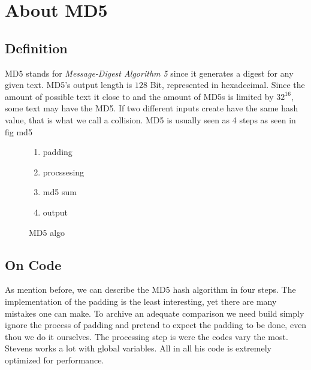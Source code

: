 \chapter{About MD5}
\label{chapter:kap2}
\section{Definition}
MD5 stands for \textit{Message-Digest Algorithm 5} since it generates a digest for any given text. MD5's output length is $128$ Bit, represented in hexadecimal. Since the amount of possible text it close to
and the amount of MD5s is limited by $32^{16}$, some text may have the MD5. If two different inputs create have the same hash value, that is what we call a collision.
MD5 is usually seen as 4 steps as seen in fig {md5}\\
\begin{figure}
    \begin{enumerate}
        \item padding
        \item procssesing
        \item md5 sum 
        \item output
    \end{enumerate}
\caption{MD5 algo}
\label{md5}
\end{figure}

\section{On Code}

As mention before, we can describe the MD5 hash algorithm in four steps.
The implementation of the padding is the least interesting, yet there are many mistakes one can make.
To archive an adequate comparison we need build simply ignore the process of padding and pretend to expect the padding to be done, even thou we do it ourselves.
The processing step is were the codes vary the most. Stevens works a lot with global variables. All in all his code is extremely optimized for performance.

